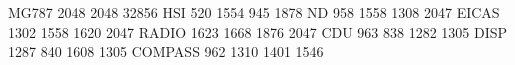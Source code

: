 MG787 2048 2048 32856
HSI      520 1554  945 1878
ND       958 1558 1308 2047
EICAS   1302 1558 1620 2047
RADIO   1623 1668 1876 2047
CDU      963  838 1282 1305
DISP    1287  840 1608 1305
COMPASS 962  1310 1401 1546

